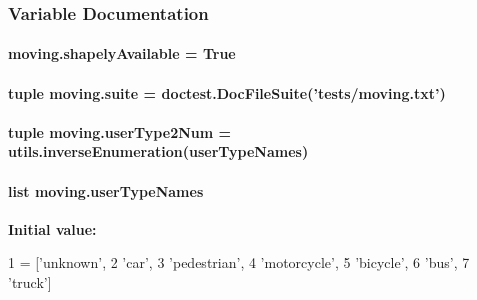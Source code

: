 \subsubsection{Variable Documentation}
\hypertarget{namespacemoving_a1e5abaac58d54cc515ff42fd5d7c491d}{
\paragraph[{shapely\-Available}]{\setlength{\rightskip}{0pt plus 5cm}moving.\-shapely\-Available = True}}\label{namespacemoving_a1e5abaac58d54cc515ff42fd5d7c491d}
\hypertarget{namespacemoving_ad8b48c70544f431c19268bc377487540}{
\paragraph[{suite}]{\setlength{\rightskip}{0pt plus 5cm}tuple moving.\-suite = doctest.\-Doc\-File\-Suite('tests/moving.\-txt')}}\label{namespacemoving_ad8b48c70544f431c19268bc377487540}
\hypertarget{namespacemoving_a8c5c469a67b42a3e702601e7b5a3b174}{
\paragraph[{user\-Type2\-Num}]{\setlength{\rightskip}{0pt plus 5cm}tuple moving.\-user\-Type2\-Num = {\bf utils.\-inverse\-Enumeration}({\bf user\-Type\-Names})}}\label{namespacemoving_a8c5c469a67b42a3e702601e7b5a3b174}
\hypertarget{namespacemoving_ae1d78e9bdfa7d0a07461b621aae1fd12}{
\paragraph[{user\-Type\-Names}]{\setlength{\rightskip}{0pt plus 5cm}list moving.\-user\-Type\-Names}}\label{namespacemoving_ae1d78e9bdfa7d0a07461b621aae1fd12}
{\bfseries Initial value\-:}
\begin{DoxyCode}
1 = [\textcolor{stringliteral}{'unknown'},
2                  \textcolor{stringliteral}{'car'},
3                  \textcolor{stringliteral}{'pedestrian'},
4                  \textcolor{stringliteral}{'motorcycle'},
5                  \textcolor{stringliteral}{'bicycle'},
6                  \textcolor{stringliteral}{'bus'},
7                  \textcolor{stringliteral}{'truck'}]
\end{DoxyCode}
